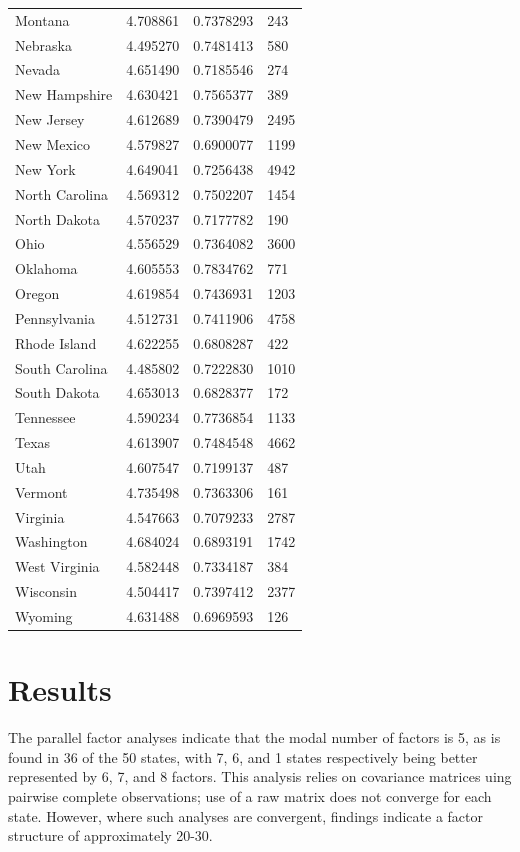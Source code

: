 \documentclass[
  english,
  man]{apa6}
\begin{document}
\begin{landscape}
\begin{longtable}[t]{llll}
\addlinespace
Montana & 4.708861 & 0.7378293 & 243\\
Nebraska & 4.495270 & 0.7481413 & 580\\
Nevada & 4.651490 & 0.7185546 & 274\\
New Hampshire & 4.630421 & 0.7565377 & 389\\
New Jersey & 4.612689 & 0.7390479 & 2495\\
\addlinespace
New Mexico & 4.579827 & 0.6900077 & 1199\\
New York & 4.649041 & 0.7256438 & 4942\\
North Carolina & 4.569312 & 0.7502207 & 1454\\
North Dakota & 4.570237 & 0.7177782 & 190\\
Ohio & 4.556529 & 0.7364082 & 3600\\
\addlinespace
Oklahoma & 4.605553 & 0.7834762 & 771\\
Oregon & 4.619854 & 0.7436931 & 1203\\
Pennsylvania & 4.512731 & 0.7411906 & 4758\\
Rhode Island & 4.622255 & 0.6808287 & 422\\
South Carolina & 4.485802 & 0.7222830 & 1010\\
\addlinespace
South Dakota & 4.653013 & 0.6828377 & 172\\
Tennessee & 4.590234 & 0.7736854 & 1133\\
Texas & 4.613907 & 0.7484548 & 4662\\
Utah & 4.607547 & 0.7199137 & 487\\
Vermont & 4.735498 & 0.7363306 & 161\\
\addlinespace
Virginia & 4.547663 & 0.7079233 & 2787\\
Washington & 4.684024 & 0.6893191 & 1742\\
West Virginia & 4.582448 & 0.7334187 & 384\\
Wisconsin & 4.504417 & 0.7397412 & 2377\\
Wyoming & 4.631488 & 0.6969593 & 126\\*
\end{longtable}
\end{landscape}
\endgroup{}

\hypertarget{results}{%
\section{Results}\label{results}}

The parallel factor analyses indicate that the modal number of factors is 5, as is found in 36 of the 50 states, with 7, 6, and 1 states respectively being better represented by 6, 7, and 8 factors. This analysis relies on covariance matrices uing pairwise complete observations; use of a raw matrix does not converge for each state. However, where such analyses are convergent, findings indicate a factor structure of approximately 20-30.
\end{document}
